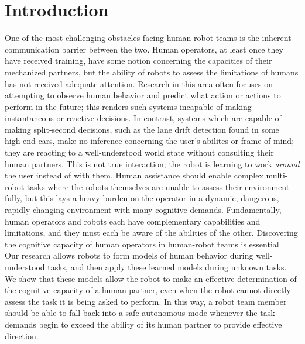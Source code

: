 \documentclass{sig-alternate}
\begin{document}



\section{Introduction}
One of the most challenging obstacles facing human-robot teams is the
inherent communication barrier between the two. Human operators, at
least once they have received training, have some notion concerning
the capacities of their mechanized partners, but the ability of robots
to assess the limitations of humans has not received adequate
attention. Research in this area often focuses on attempting to
observe human behavior and predict what action or actions to perform
in the future; this renders such systems incapable of making
instantaneous or reactive decisions. In contrast, systems which are
capable of making split-second decisions, such as the lane drift
detection found in some high-end cars, make no inference concerning
the user's abilites or frame of mind; they are reacting to a
well-understood world state without consulting their human
partners. This is not true interaction; the robot is learning to work
\textit{around} the user instead of with them.  Human assistance
should enable complex multi-robot tasks where the robots themselves
are unable to assess their environment fully, but this lays a heavy
burden on the operator in a dynamic, dangerous, rapidly-changing
environment with many cognitive demands.  Fundamentally, human
operators and robots each have complementary capabilities and
limitations, and they must each be aware of the abilities of the
other.  Discovering the cognitive capacity of human operators in
human-robot teams is essential \cite{Malchus:2013:REC:2447556.2447632}.
Our research allows robots to form models of human behavior during
well-understood tasks, and then apply these learned models during
unknown tasks.  We show that these models allow the robot to make an
effective determination of the cognitive capacity of a human partner,
even when the robot cannot directly assess the task it is being asked
to perform.  In this way, a robot team member should be able to fall
back into a safe autonomous mode whenever the task demands begin to
exceed the ability of its human partner to provide effective
direction.
\end{document}
